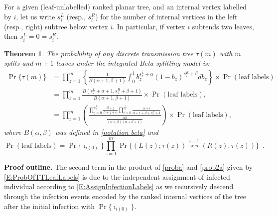 \documentclass[review]{elsarticle}
\numberwithin{equation}{section}
\let\orgautoref\autoref
\renewcommand{\autoref}
        {\def\equationautorefname{Eq.}%
         \def\figureautorefname{Fig.}%
         \def\subfigureautorefname{Fig.}%
         \def\sectionautorefname{Sect.}%
         \def\subsectionautorefname{Sect.}%
         \def\subsubsectionautorefname{Sect.}%
         \def\Itemautorefname{item}%
         \def\tableautorefname{Table}%
         \def\propositionautorefname{Prop.}%
         \def\corollaryautorefname{Corollary}%
         \def\theoremautorefname{Theorem}%
         \def\remarkautorefname{Remark}%
         \def\lemmaautorefname{Lemma}%
         \def\proofofautorefname{Proof}%
         \def\exampleautorefname{Example}%
         \orgautoref}
\newtheorem{theorem}{Theorem}%
\begin{document}
For a given (leaf-unlabelled) ranked planar tree, and an internal vertex labelled by $i$, let us write $s_i^L$ (resp., $s_i^R$) for the number of internal vertices in the left (resp., right) subtree below vertex $i$. In particular, if vertex $i$ subtends two leaves, then $s_i^L=0=s_i^R$.

\smallskip
\begin{theorem}\label{th:proba}
The probability of any discrete transmission tree $\tau(m)$ with $m$ splits and $m+1$ leaves under the integrated Beta-splitting model is:
\begin{align}
\Pr\{\tau(m)\} &= \prod_{z=1}^{m} \left\{\frac{1}{B(\alpha+1,\beta+1)}\int_0^1 b_z^{s_z^L+\alpha}(1-b_z)^{s_z^R+\beta}db_z\right\}  \times \Pr\left( \textrm{leaf labels} \right)\nonumber\\
& = \prod_{z=1}^{m} \frac{B(s_z^L+\alpha+1,s_z^R+\beta+1)}{B(\alpha+1,\beta+1)} \times \Pr\left( \textrm{leaf labels} \right) , \label{proba}\\
& = \prod_{z=1}^{m} \left( \frac{\prod_{j=0}^{s_z^R}\frac{\beta+j}{\beta+j+\alpha} \prod_{i=0}^{s_z^L} \frac{\alpha+i}{\alpha+i+\beta+s_z^R+1}}
{\frac{\alpha \beta}{(\alpha+\beta)(\alpha+\beta+1)}}\right) \times \Pr\left( \textrm{leaf labels} \right), \label{prob2a}
\end{align}
where $B(\alpha,\beta)$ was defined in \autoref{notation beta} and 
\begin{equation}\label{E:ProbOfTTLeafLabels}
\Pr\left( \textrm{leaf labels} \right) = \Pr\{\imath_{i(0)}\} \prod_{z=1}^m \Pr\{(L(z);\tau(z)) \overset{z-1}{\rightsquigarrow} (R(z);\tau(z))\} \enspace.
\end{equation}
\end{theorem}

\smallskip
\noindent\textbf{Proof outline.} 
The second term in the product of \autoref{proba} and \autoref{prob2a} given by \autoref{E:ProbOfTTLeafLabels} is due to the independent assignment of infected individual according to \autoref{E:AssignInfectionLabels} as we recursively descend through the infection events encoded by the ranked internal vertices of the tree after the initial infection with $\Pr\{\imath_{i(0)}\}$. 
\end{document}

